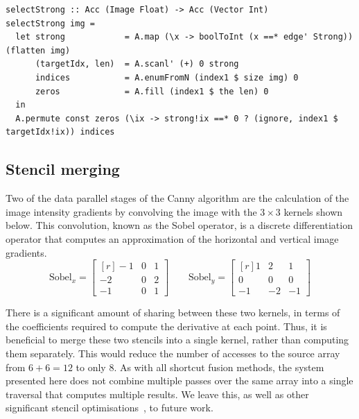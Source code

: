 \begin{lstlisting}[style=haskell_float
    ,label=lst:canny-kernels
    ,caption={The data-parallel kernels of the Canny edge detection algorithm}]
selectStrong :: Acc (Image Float) -> Acc (Vector Int)
selectStrong img =
  let strong            = A.map (\x -> boolToInt (x ==* edge' Strong)) (flatten img)
      (targetIdx, len)  = A.scanl' (+) 0 strong
      indices           = A.enumFromN (index1 $ size img) 0
      zeros             = A.fill (index1 $ the len) 0
  in
  A.permute const zeros (\ix -> strong!ix ==* 0 ? (ignore, index1 $ targetIdx!ix)) indices
\end{lstlisting}


\subsection{Stencil merging}

Two of the data parallel stages of the Canny algorithm are the calculation of
the image intensity gradients by convolving the image with the $3\times3$
kernels shown below. This convolution, known as the Sobel operator, is a
discrete differentiation operator that computes an approximation of the
horizontal and vertical image gradients.
%
\begin{equation*}
    \text{Sobel}_x =
        \begin{bmatrix*}[r]
          -1 & 0 & 1 \\
          -2 & 0 & 2 \\
          -1 & 0 & 1
        \end{bmatrix*}
    \qquad
    \text{Sobel}_y =
        \begin{bmatrix*}[r]
           1 &  2 &  1 \\
           0 &  0 &  0 \\
          -1 & -2 & -1
        \end{bmatrix*}
\end{equation*}

There is a significant amount of sharing between these two kernels, in terms of
the coefficients required to compute the derivative at each point. Thus, it
is beneficial to merge these two stencils into a single kernel, rather
than computing them separately. This would reduce the number of accesses to the
source array from $6+6=12$ to only $8$. As with all shortcut fusion methods, the
system presented here does not combine multiple passes over the same array into
a single traversal that computes multiple results. We leave this, as well as
other significant stencil
optimisations~\cite{Henretty:2013wb,Kamil:2006un,Lesniak:2010}, to future work.



